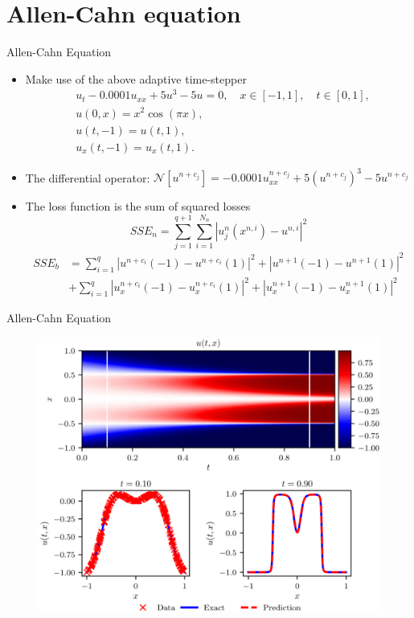 \documentclass[xcolor=dvipsnames,10pt]{beamer}
\begin{document}
\section{Allen-Cahn equation}
\begin{frame}[t]{Allen-Cahn Equation}
  \begin{itemize}
    \item<2-> Make use of the above adaptive time-stepper
    $$
      \begin{aligned}
        &u_{t}-0.0001 u_{x x}+5 u^{3}-5 u=0, \quad x \in[-1,1], \quad t \in[0,1], \\
        &u(0, x)=x^{2} \cos (\pi x), \\
        &u(t,-1)=u(t, 1), \\
        &u_{x}(t,-1)=u_{x}(t, 1) .
      \end{aligned}
    $$
    \item<3-> The differential operator: $\mathcal{N}\left[u^{n+c_{j}}\right]=-0.0001 u_{x x}^{n+c_{j}}+5\left(u^{n+c_{j}}\right)^{3}-5 u^{n+c_{j}}$
    \item<4-> The loss function is the sum of squared losses 
    $$
      S S E_{n}=\sum_{j=1}^{q+1} \sum_{i=1}^{N_{n}}\left|u_{j}^{n}\left(x^{n, i}\right)-u^{n, i}\right|^{2}
    $$
    $$
      \begin{aligned}
        S S E_{b}
        &=
        \sum_{i=1}^{q}\left|u^{n+c_{i}}(-1)-u^{n+c_{i}}(1)\right|^{2}+\left|u^{n+1}(-1)-u^{n+1}(1)\right|^{2} \\
        &+
        \sum_{i=1}^{q}\left|u_{x}^{n+c_{i}}(-1)-u_{x}^{n+c_{i}}(1)\right|^{2}+\left|u_{x}^{n+1}(-1)-u_{x}^{n+1}(1)\right|^{2}
      \end{aligned}
    $$
  \end{itemize}
\end{frame}
\begin{frame}[t]{Allen-Cahn Equation}
  \begin{figure}[H]
    \centering
    \includegraphics[width=0.7\linewidth]{u_tx.eps}
  \end{figure}
\end{frame}
\end{document}
